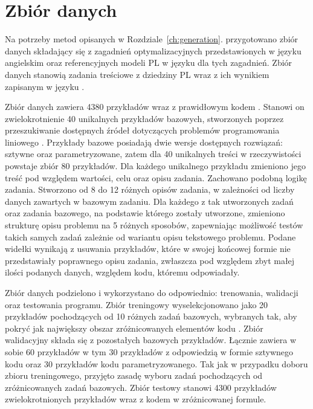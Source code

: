 
\chapter{Zbiór danych}\label{ch:dataset}

Na potrzeby metod opisanych w Rozdziale~\ref{ch:generation}. przygotowano zbiór danych składający się z zagadnień optymalizacyjnych przedstawionych w języku angielskim oraz referencyjnych modeli PL w języku  dla tych zagadnień. Zbiór danych stanowią zadania treściowe z dziedziny PL wraz z ich wynikiem zapisanym w języku .

Zbiór danych zawiera 4380 przykładów wraz z prawidłowym kodem . Stanowi on zwielokrotnienie 40 unikalnych przykładów bazowych, stworzonych poprzez przeszukiwanie dostępnych źródeł dotyczących problemów programowania liniowego \cite{brilliant_linear,byjus_linear,cimt,arsdcollege2020,libretexts_linear,superprof_linear,toppr_graphical}. Przykłady bazowe posiadają dwie wersje dostępnych rozwiązań: sztywne oraz parametryzowane, zatem dla 40 unikalnych treści w rzeczywistości powstaje zbiór 80 przykładów. Dla każdego unikalnego przykładu zmieniono jego treść pod względem wartości, celu oraz opisu zadania. Zachowano podobną logikę zadania. Stworzono od 8 do 12 różnych opisów zadania, w zależności od liczby danych zawartych w bazowym zadaniu. Dla każdego z tak utworzonych zadań oraz zadania bazowego, na podstawie którego zostały utworzone, zmieniono strukturę opisu problemu na 5 różnych sposobów, zapewniając możliwość testów takich samych zadań zależnie od wariantu opisu tekstowego problemu. Podane widełki wynikają z usuwania przykładów, które w swojej końcowej formie nie przedstawiały poprawnego opisu zadania, zwłaszcza pod względem zbyt małej ilości podanych danych, względem kodu, któremu odpowiadały.

Zbiór danych podzielono i wykorzystano do odpowiednio: trenowania, walidacji oraz testowania programu. Zbiór treningowy wyselekcjonowano jako 20 przykładów pochodzących od 10 różnych zadań bazowych, wybranych tak, aby pokryć jak największy obszar zróżnicowanych elementów kodu . Zbiór walidacyjny składa się z pozostałych bazowych przykładów. Łącznie zawiera w sobie 60 przykładów w tym 30 przykładów z odpowiedzią w formie sztywnego kodu oraz 30 przykładów kodu parametryzowanego. Tak jak w przypadku doboru zbioru treningowego, przyjęto zasadę wyboru zadań pochodzących od zróżnicowanych zadań bazowych. Zbiór testowy stanowi 4300 przykładów zwielokrotnionych przykładów wraz z kodem  w zróżnicowanej formule.  %


